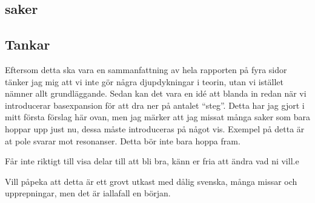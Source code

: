 \documentclass[12pt,a4paper]{report}
\begin{document}
\subsection{saker}

\subsection{Tankar}
Eftersom detta ska vara en sammanfattning av hela rapporten på fyra sidor tänker jag mig att vi inte gör några djupdykningar i teorin, utan vi istället nämner allt grundläggande. Sedan kan det vara en idé att blanda in  redan när vi introducerar basexpansion för att dra ner på antalet ``steg''. Detta har jag gjort i mitt första förslag här ovan, men jag märker att jag missat många saker som bara hoppar upp just nu, dessa måste introduceras på något vis. Exempel på detta är at pole svarar mot resonanser. Detta bör inte bara hoppa fram.

Får inte riktigt till visa delar till att bli bra, känn er fria att ändra vad ni vill.e

Vill påpeka att detta är ett grovt utkast med dålig svenska, många missar och upprepningar, men det är iallafall en början.
\end{document}
